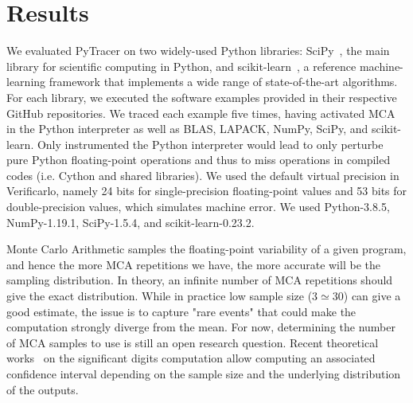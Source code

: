 \documentclass[10pt,journal,compsoc]{IEEEtran}
\newcommand{\pytracer}[0]{PyTracer\xspace}
\DeclareRobustCommand{\add}[1]{#1}
\begin{document}
\section{Results}

We evaluated \pytracer on two widely-used Python libraries:
SciPy~\cite{virtanen2020scipy}, the main library for scientific computing in
Python, and  scikit-learn~\cite{pedregosa2011scikit}, a reference
machine-learning framework that implements a wide range of state-of-the-art
algorithms. For each library, we executed the software examples provided in
their respective GitHub repositories. We traced each example five times, having
activated MCA in the Python interpreter \add{as well as} BLAS, LAPACK, NumPy,
SciPy, and scikit-learn. \add{Only instrumented the Python interpreter would
    lead to only perturbe pure Python floating-point operations and thus to miss
    operations in compiled codes (i.e. Cython and shared libraries).} We used the default virtual
precision in Verificarlo, namely 24 bits for single-precision floating-point
values and 53 bits for double-precision values, which simulates machine error.
We used Python-3.8.5, NumPy-1.19.1, SciPy-1.5.4, and scikit-learn-0.23.2.

\add{Monte Carlo Arithmetic samples the floating-point variability of a given
    program, and hence the more MCA repetitions we have, the more accurate will be
    the sampling distribution. In theory, an infinite number of MCA repetitions
    should give the exact distribution. While in practice low sample size (3$\simeq$30)
    can give a good estimate, the issue is to capture "rare events" that could make the
    computation strongly diverge from the mean. For now, determining the number of
    MCA samples to use is still an open research question. 
    Recent theoretical works}~\cite{sohier2021confidence}
\add{on the significant digits computation allow computing an associated
    confidence interval depending on the sample size and the underlying distribution of the outputs.}

\end{document}
